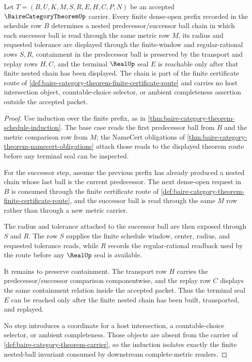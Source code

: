 \begin{theorem}
\label{thm:baire-category-theorem-finite-prefix-nested-ball}
Let $T=(B,U,K,M,S,R,E,H,C,P,N)$ be an accepted $\BaireCategoryTheoremUp$ carrier. Every finite dense-open prefix recorded in the schedule row $B$ determines a nested predecessor/successor ball chain in which each successor ball is read through the same metric row $M$, its radius and requested tolerance are displayed through the finite-window and regular-rational rows $S,R$, containment in the predecessor ball is preserved by the transport and replay rows $H,C$, and the terminal $\RealUp$ seal $E$ is reachable only after that finite nested chain has been displayed. The chain is part of the finite certificate route of \autoref{def:baire-category-theorem-finite-certificate-route} and carries no host intersection object, countable-choice selector, or ambient completeness assertion outside the accepted packet.
\end{theorem}
\begin{proof}
Use induction over the finite prefix, as in \autoref{thm:baire-category-theorem-schedule-induction}. The base case reads the first predecessor ball from $B$ and the metric comparison row from $M$; the NameCert obligations of \autoref{thm:baire-category-theorem-namecert-obligations} attach those reads to the displayed theorem route before any terminal seal can be inspected.

For the successor step, assume the previous prefix has already produced a nested chain whose last ball is the current predecessor. The next dense-open request in $B$ is consumed through the finite certificate route of \autoref{def:baire-category-theorem-finite-certificate-route}, and the successor ball is read through the same $M$ row rather than through a new metric carrier.

The radius and tolerance attached to the successor ball are then exposed through $S$ and $R$. The row $S$ supplies the finite schedule window, center, radius, and requested tolerance reads, while $R$ records the regular-rational readback used by the route before any $\RealUp$ seal is available.

It remains to preserve containment. The transport row $H$ carries the predecessor/successor comparison componentwise, and the replay row $C$ displays the same containment relation inside the accepted packet. Thus the terminal seal $E$ can be reached only after the finite nested chain has been built, transported, and replayed.

No step introduces a coordinate for a host intersection, a countable-choice selector, or ambient completeness. Those objects are absent from the carrier of \autoref{def:baire-category-theorem-carrier}, so the induction isolates exactly the finite nested-ball invariant consumed by downstream complete-metric readers.
\end{proof}


